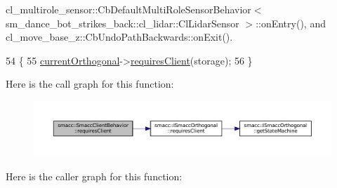 cl\+\_\+multirole\+\_\+sensor\+::\+Cb\+Default\+Multi\+Role\+Sensor\+Behavior$<$ sm\+\_\+dance\+\_\+bot\+\_\+strikes\+\_\+back\+::cl\+\_\+lidar\+::\+Cl\+Lidar\+Sensor $>$\+::on\+Entry(), and cl\+\_\+move\+\_\+base\+\_\+z\+::\+Cb\+Undo\+Path\+Backwards\+::on\+Exit().


\begin{DoxyCode}
54 \{
55     \hyperlink{classsmacc_1_1SmaccClientBehavior_a37e6a2fe61c3a72ed2f3e4180f552089}{currentOrthogonal}->\hyperlink{classsmacc_1_1ISmaccOrthogonal_a602e16b09f8a1b3de889f2f3d90a3211}{requiresClient}(storage);
56 \}
\end{DoxyCode}
Here is the call graph for this function\+:
\nopagebreak
\begin{figure}[H]
\begin{center}
\leavevmode
\includegraphics[width=350pt]{classsmacc_1_1SmaccClientBehavior_a917f001e763a1059af337bf4e164f542_cgraph}
\end{center}
\end{figure}
Here is the caller graph for this function\+:
\nopagebreak
